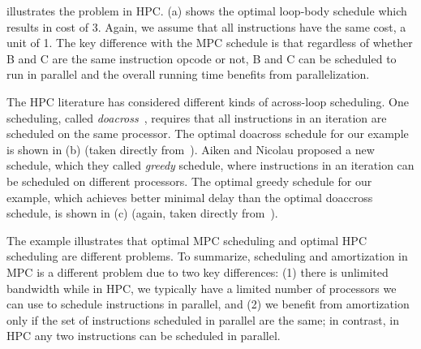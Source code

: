 \documentclass[sigconf, screen, natbib=false, dvipsnames, table]{acmart}
\theoremstyle{definition}
\begin{document}
 illustrates the problem in HPC. (a) shows the optimal loop-body schedule
which results in cost of 3. Again, we assume that all instructions have the same cost, a unit of 1. The key difference with the 
MPC schedule is that regardless of whether B and C are the same instruction opcode or not, B and C can be scheduled 
to run in parallel and the overall running time benefits from parallelization. 

The HPC literature has considered different kinds of across-loop scheduling. One scheduling, called \emph{doacross}~\cite{aiken,cytron},
requires that all instructions in an iteration are scheduled on the same processor. The optimal doacross schedule for our example
is shown in (b) (taken directly from~\cite{aiken}). Aiken and Nicolau proposed a new schedule,
which they called \emph{greedy} schedule, where instructions in an iteration can be scheduled on different processors. 
The optimal greedy schedule for our example, which achieves better minimal delay than the optimal doaccross schedule, 
is shown in (c) (again, taken directly from~\cite{aiken}). 

The example illustrates that optimal MPC scheduling and optimal HPC scheduling are different problems.
To summarize, scheduling and amortization in MPC is a different problem due to two key differences: (1) there 
is unlimited bandwidth while in HPC, we typically have a limited number of processors we can use to 
schedule instructions in parallel, and (2) we benefit from amortization only if the set of instructions scheduled
in parallel are the same; in contrast, in HPC any two instructions can be scheduled in parallel. 




\end{document}
